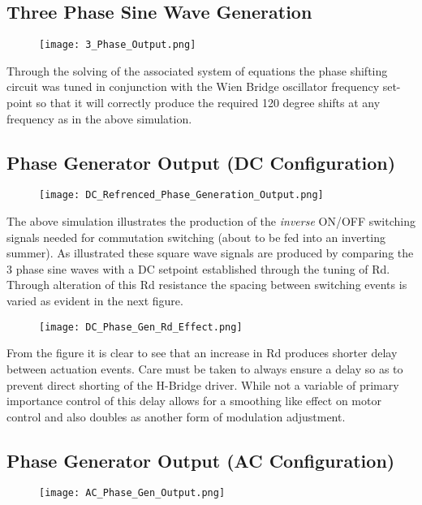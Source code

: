 \documentclass[12pt]{article}
\begin{document}
\begin{appendices}
\subsection{Three Phase Sine Wave Generation}
\begin{figure}[H]
\centering
\texttt{[image: 3\_Phase\_Output.png]}
\label{Triangle_Gen_Output}
\end{figure}

Through the solving of the associated system of equations the phase shifting circuit was tuned in conjunction with the Wien Bridge oscillator frequency set-point so that it will correctly produce the required 120 degree shifts at any frequency as in the above simulation.

\subsection{Phase Generator Output (DC Configuration)}
\begin{figure}[H]
\centering
\texttt{[image: DC\_Refrenced\_Phase\_Generation\_Output.png]}
\label{Triangle_Gen_Output}
\end{figure}

The above simulation illustrates the production of the \emph{inverse} ON/OFF switching signals needed for commutation switching (about to be fed into an inverting summer). As illustrated these square wave signals are produced by comparing the 3 phase sine waves with a DC setpoint established through the tuning of Rd. Through alteration of this Rd resistance the spacing between switching events is varied as evident in the next figure.

\begin{figure}[H]
\centering
\texttt{[image: DC\_Phase\_Gen\_Rd\_Effect.png]}
\label{Triangle_Gen_Output}
\end{figure}

From the figure it is clear to see that an increase in Rd produces shorter delay between actuation events. Care must be taken to always ensure a delay so as to prevent direct shorting of the H-Bridge driver. While not a variable of primary importance control of this delay allows for a smoothing like effect on motor control and also doubles as another form of modulation adjustment.

\subsection{Phase Generator Output (AC Configuration)}
\begin{figure}[H]
\centering
\texttt{[image: AC\_Phase\_Gen\_Output.png]}
\label{Triangle_Gen_Output}
\end{figure}


\end{appendices}
\end{document}
